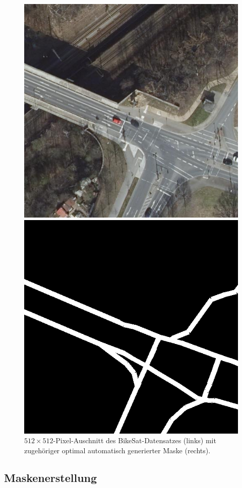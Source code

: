 \begin{figure}
	\centering
	\begin{minipage}{.45\textwidth}
		\centering
		\includegraphics[width=.7\linewidth]{Bilder/good-cut-ex.png} 
	\end{minipage}
	\begin{minipage}{.45\textwidth}
		\centering
		\includegraphics[width=.7\linewidth]{Bilder/good-cut-ex-mask.png} 
	\end{minipage}

	\caption{$512{\times}512$-Pixel-Auschnitt des BikeSat-Datensatzes (links) 
	mit zugehöriger optimal automatisch generierter Maske (rechts).}
	\label{fig:good-mask}
\end{figure} 

\subsection{Maskenerstellung}

